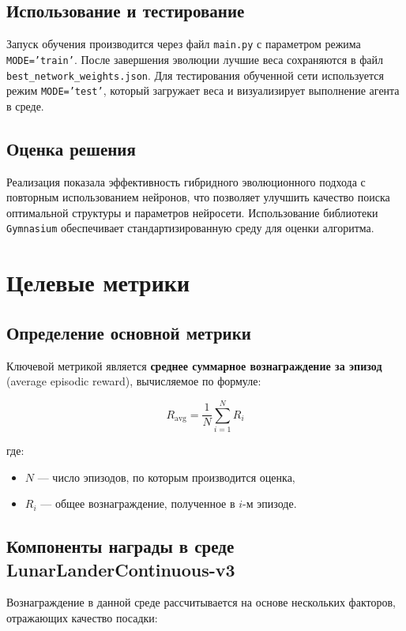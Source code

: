 \documentclass[a4paper,12pt]{article}
\begin{document}
\subsection{Использование и тестирование}

Запуск обучения производится через файл \texttt{main.py} с параметром режима \texttt{MODE='train'}. После завершения эволюции лучшие веса сохраняются в файл \texttt{best\_network\_weights.json}. Для тестирования обученной сети используется режим \texttt{MODE='test'}, который загружает веса и визуализирует выполнение агента в среде.

\subsection{Оценка решения}

Реализация показала эффективность гибридного эволюционного подхода с повторным использованием нейронов, что позволяет улучшить качество поиска оптимальной структуры и параметров нейросети. Использование библиотеки \texttt{Gymnasium} обеспечивает стандартизированную среду для оценки алгоритма.




\newpage


\section{Целевые метрики}

\subsection{Определение основной метрики}
Ключевой метрикой является \textbf{среднее суммарное вознаграждение за эпизод} (average episodic reward), вычисляемое по формуле:

\[
R_{\text{avg}} = \frac{1}{N} \sum_{i=1}^{N} R_i
\]

где:
\begin{itemize}
    \item $N$ — число эпизодов, по которым производится оценка,
    \item $R_i$ — общее вознаграждение, полученное в $i$-м эпизоде.
\end{itemize}

\subsection{Компоненты награды в среде LunarLanderContinuous-v3}
Вознаграждение в данной среде рассчитывается на основе нескольких факторов, отражающих качество посадки:
\end{document}
